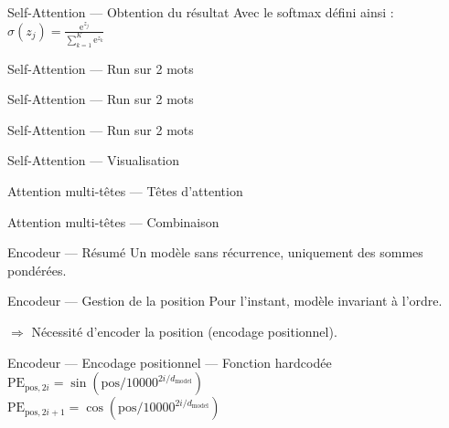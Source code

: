 \begin{frame}{Self-Attention --- Obtention du résultat}
  Avec le softmax défini ainsi : $\sigma(z_j)=\frac {\mathrm{e}^{z_j}}{\sum _{k=1}^{K}\mathrm{e}^{z_{k}}}$
\end{frame}

\begin{frame}{Self-Attention --- Run sur 2 mots}
\end{frame}

\begin{frame}{Self-Attention --- Run sur 2 mots}
\end{frame}

\begin{frame}{Self-Attention --- Run sur 2 mots}
\end{frame}

\begin{frame}{Self-Attention --- Visualisation}
\end{frame}

\begin{frame}{Attention multi-têtes --- Têtes d'attention}
\end{frame}

\begin{frame}{Attention multi-têtes --- Combinaison}
\end{frame}

\begin{frame}{Encodeur --- Résumé}
  Un modèle sans récurrence, uniquement des sommes pondérées.

\end{frame}

\begin{frame}{Encodeur --- Gestion de la position}
  Pour l'instant, modèle invariant à l'ordre.

  $\Rightarrow$ Nécessité d'encoder la position (encodage positionnel).
\end{frame}

\begin{frame}{Encodeur --- Encodage positionnel --- Fonction hardcodée}
  $\text{PE}_{\text{pos}, 2i} = \sin{(\text{pos} / 10000^{2i / d_{\text{model}}})}$ \\
  $\text{PE}_{\text{pos}, 2i + 1}= \cos{(\text{pos} / 10000^{2i / d_{\text{model}}})}$
\end{frame}

